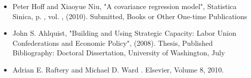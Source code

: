 \documentclass[pdftex,12pt,fullpage,oneside]{amsart}
\begin{document}
\begin{itemize}
\item  Peter Hoff and Xiaoyue Niu, "A covariance regression model", Statistica Sinica, p. , vol. , (2010). Submitted,
Books or Other One-time Publications
\item  John S. Ahlquist, "Building and Using Strategic Capacity: Labor Union Confederations and Economic Policy", (2008). Thesis, Published
Bibliography: Doctoral Dissertation, University of Washington, July
\item  Adrian E. Raftery and Michael D. Ward
.
\newblock Elsevier, Volume 8, 2010.

\end{itemize}


\newpage
\setcounter{page}{1}

 




\end{document}
